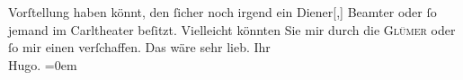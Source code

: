 \begin{ledgroupsized}[t]{13cm}
               Vorſtellung haben könnt, den ſicher noch irgend ein Diener{[},{]}
               Beamter oder ſo jemand im Carltheater beſitzt.
               Vielleicht könnten Sie mir durch die \textsc{Glümer} oder ſo mir einen verſchaffen. Das wäre sehr lieb.\pend
           \pstart
           Ihr{\\[\baselineskip]}\spacefill\mbox{Hugo.}\pend
           \leftskip=0em{}
         
         \endnumbering{}\end{ledgroupsized}  \newcommand{\dateiname}{L00782}\newcommand{\titel}{Hugo von Hofmannsthal an Arthur Schnitzler, [10. 3. 1898?]}\newcommand{\editorInnen}{Martin Anton Müller und Gerd-Hermann Susen}
      